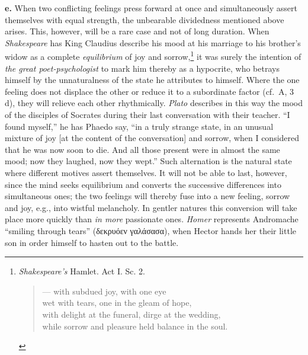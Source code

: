 \documentclass[12pt,a4paper]{book}
\newcommand{\opage}[1]{\marginnote{\footnotesize\textit{[#1]}}}
\begin{document}
\textbf{e.} When two conflicting feelings press forward at once and
simultaneously assert themselves with equal strength, the unbearable
dividedness mentioned above arises. This, however, will be a rare case
and not of long duration. When \emph{Shakespeare} has King Claudius
describe his mood at his marriage to his brother's widow as a complete
\emph{equilibrium}
of joy and sorrow,\footnote{\emph{Shakespeare's} Hamlet. Act I. Sc. 2.
\begin{verse}
--- with subdued joy, with one eye\\
wet with tears, one in the gleam of hope,\\
with delight at the funeral, dirge at the wedding,\\
while sorrow and pleasure held balance in the soul.
\end{verse}}
it was surely the intention of \emph{the great poet-psychologist} to
mark him thereby as a hypocrite, who betrays himself by the
unnaturalness of the state he attributes to himself. Where the one
feeling does not displace the other or reduce it to a subordinate factor
(cf.\ A, 3 d), they will relieve each other rhythmically. \emph{Plato}
describes in this way the mood of the disciples of Socrates during their
last conversation with their teacher. ``I found myself,'' he has Phaedo
say, ``in a truly strange state, in an unusual mixture of joy [at the
content of the conversation] and sorrow, when I considered that he was
now soon to die. And all those present were in almost the same mood; now
they laughed, now they wept.'' Such alternation is the natural state
where different motives assert themselves. It will not be able to last,
however, since the mind seeks equilibrium and converts the successive
differences into simultaneous ones; the two feelings will thereby fuse
into a new feeling, sorrow and joy, e.g., into wistful melancholy. In
gentler natures this conversion will take place more quickly than
\emph{in more} passionate ones. \emph{Homer} represents Andromache
``smiling
\opage{288}through tears'' (δεκρυόεν γαλάσασα), when Hector hands her
their little son in order himself to hasten out to the battle.
\end{document}
